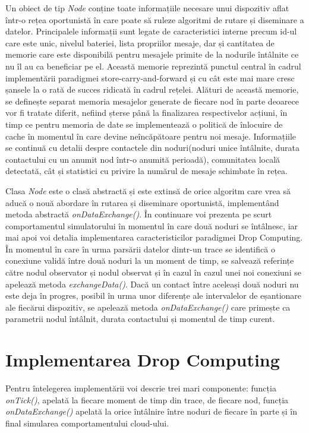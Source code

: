 \documentclass[12pt,a4paper]{report}
\begin{document}
Un obiect de tip \textit{Node} conține toate informațiile necesare unui dispozitiv aflat într-o rețea oportunistă în care poate să ruleze algoritmi de rutare și diseminare a datelor. Principalele informații sunt legate de caracteristici interne precum id-ul care este unic, nivelul bateriei, lista propriilor mesaje, dar și cantitatea de memorie care este disponibilă pentru mesajele primite de la nodurile întâlnite ce nu îl au ca beneficiar pe el. Această memorie reprezintă punctul central în cadrul implementării paradigmei store-carry-and-forward și cu cât este mai mare cresc șansele la o rată de succes ridicată în cadrul rețelei. Alături de această memorie, se definește separat memoria mesajelor generate de fiecare nod în parte deoarece vor fi tratate diferit, nefiind șterse până la finalizarea respectivelor acțiuni, în timp ce pentru memoria de date se implementează o politică de înlocuire de cache în momentul în care devine neîncăpătoare pentru noi mesaje. 
Informațiile se continuă cu detalii despre contactele din noduri(noduri unice întâlnite, durata contactului cu un anumit nod într-o anumită perioadă), comunitatea locală detectată, cât și statistici cu privire la numărul de mesaje schimbate în rețea. 

Clasa \textit{Node} este o clasă abstractă și este extinsă de orice algoritm care vrea să aducă o nouă abordare în rutarea și diseminare oportunistă, implementând metoda abstractă \textit{onDataExchange()}. În continuare voi prezenta pe scurt comportamentul simulatorului în momentul în care două noduri se întâlnesc, iar mai apoi voi detalia implementarea caracteristicilor paradigmei Drop Computing\cite{DC}. În momentul în care în urma parsării datelor dintr-un trace se identifică o conexiune validă între două noduri la un moment de timp, se salvează referințe către nodul observator și nodul observat și în cazul în cazul unei noi conexiuni se apelează metoda \textit{exchangeData()}. Dacă un contact între aceleași două noduri nu este deja în progres, posibil în urma unor diferențe ale intervalelor de eșantionare ale fiecărui dispozitiv, se apelează metoda \textit{onDataExchange()} care primește ca parametrii nodul întâlnit, durata contactului și momentul de timp curent. 

\section{Implementarea Drop Computing} \label{dropcomputing}
Pentru întelegerea implementării voi descrie trei mari componente: funcția \textit{onTick()}, apelată la fiecare moment de timp din trace, de fiecare nod, funcția \textit{onDataExchange()} apelată la orice întâlnire între noduri de fiecare în parte și în final simularea comportamentului cloud-ului.
\end{document}
